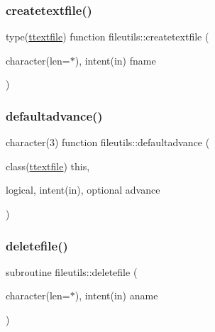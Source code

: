 \mbox{\label{namespacefileutils_a64381cf183dd4f3ab198ebe7d87b1745}} 
\subsubsection{\texorpdfstring{createtextfile()}{createtextfile()}}
{\footnotesize\ttfamily type(\mbox{\hyperlink{structfileutils_1_1ttextfile}{ttextfile}}) function fileutils\+::createtextfile (\begin{DoxyParamCaption}\item[{character(len=$\ast$), intent(in)}]{fname }\end{DoxyParamCaption})\hspace{0.3cm}{\ttfamily [private]}}

\mbox{\label{namespacefileutils_a8114041129cdfa75aa9d0c0195ff8da1}} 
\subsubsection{\texorpdfstring{defaultadvance()}{defaultadvance()}}
{\footnotesize\ttfamily character(3) function fileutils\+::defaultadvance (\begin{DoxyParamCaption}\item[{class(\mbox{\hyperlink{structfileutils_1_1ttextfile}{ttextfile}})}]{this,  }\item[{logical, intent(in), optional}]{advance }\end{DoxyParamCaption})\hspace{0.3cm}{\ttfamily [private]}}

\mbox{\label{namespacefileutils_a4123c8130fff81627f5a0bdd7674d6f7}} 
\subsubsection{\texorpdfstring{deletefile()}{deletefile()}}
{\footnotesize\ttfamily subroutine fileutils\+::deletefile (\begin{DoxyParamCaption}\item[{character(len=$\ast$), intent(in)}]{aname }\end{DoxyParamCaption})\hspace{0.3cm}{\ttfamily [private]}}



